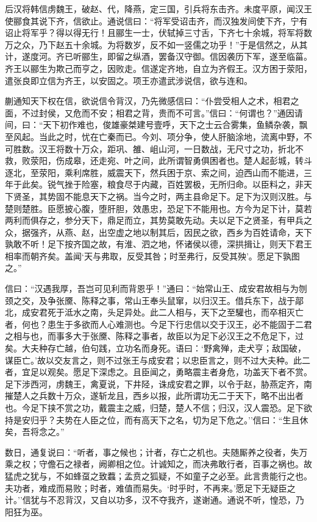 \documentclass[]{article}
\begin{document}
后汉将韩信虏魏王，破赵、代，降燕，定三国，引兵将东击齐。未度平原，闻汉王使郦食其说下齐，信欲止。通说信曰：``将军受诏击齐，而汉独发间使下齐，宁有诏止将军乎？得以得无行！且郦生一士，伏轼掉三寸舌，下齐七十余城，将军将数万之众，乃下赵五十余城。为将数岁，反不如一竖儒之功乎！''于是信然之，从其计，遂度河。齐已听郦生，即留之纵酒，罢备汉守御。信因袭历下军，遂至临菑。齐王以郦生为欺己而亨之，因败走。信遂定齐地，自立为齐假王。汉方困于荥阳，遣张良即立信为齐王，以安固之。项王亦遣武涉说信，欲与连和。

蒯通知天下权在信，欲说信令背汉，乃先微感信曰：``仆尝受相人之术，相君之面，不过封侯，又危而不安；相君之背，贵而不可言。''信曰：``何谓也？''通因请间，曰：``天下初作难也，俊雄豪桀建号壹呼，天下之士云合雾集，鱼鳞杂袭，飘至风起。当此之时，忧在亡秦而已。今刘、项分争，使人肝脑涂地，流离中野，不可胜数。汉王将数十万众，距巩、雒、岨山河，一日数战，无尺寸之功，折北不救，败荥阳，伤成皋，还走宛、叶之间，此所谓智勇俱困者也。楚人起彭城，转斗逐北，至荥阳，乘利席胜，威震天下，然兵困于京、索之间，迫西山而不能进，三年于此矣。锐气挫于险塞，粮食尽于内藏，百姓罢极，无所归命。以臣料之，非天下贤圣，其势固不能息天下之祸。当今之时，两主县命足下。足下为汉则汉胜。与楚则楚胜。臣愿披心腹，堕肝胆，效愚忠，恐足下不能用也。方今为足下计，莫若两利而俱存之，参分天下，鼎足而立，其势莫敢先动。夫以足下之贤圣，有甲兵之众，据强齐，从燕、赵，出空虚之地以制其后，因民之欲，西乡为百姓请命，天下孰敢不听！足下按齐国之故，有淮、泗之地，怀诸侯以德，深拱揖让，则天下君王相率而朝齐矣。盖闻`天与弗取，反受其咎；时至弗行，反受其殃'。愿足下孰图之。''

信曰：``汉遇我厚，吾岂可见利而背恩乎！''通曰：``始常山王、成安君故相与为刎颈之交，及争张黡、陈释之事，常山王奉头鼠窜，以归汉王。借兵东下，战于鄗北，成安君死于泜水之南，头足异处。此二人相与，天下之至驩也，而卒相灭亡者，何也？患生于多欲而人心难测也。今足下行忠信以交于汉王，必不能固于二君之相与也，而事多大于张黡、陈释之事者，故臣以为足下必汉王之不危足下，过矣。大夫种存亡越，伯句践，立功名而身死。语曰：`野禽殚，走犬亨；敌国破，谋臣亡。'故以交友言之，则不过张王与成安君；以忠臣言之，则不过大夫种。此二者，宜足以观矣。愿足下深虑之。且臣闻之，勇略震主者身危，功盖天下者不赏。足下涉西河，虏魏王，禽夏说，下井陉，诛成安君之罪，以令于赵，胁燕定齐，南摧楚人之兵数十万众，遂斩龙且，西乡以报，此所谓功无二于天下，略不出出者也。今足下挟不赏之功，戴震主之威，归楚，楚人不信；归汉，汉人震恐。足下欲持是安归乎？夫势在人臣之位，而有高天下之名，切为足下危之。''信曰：``生且休矣，吾将念之。''

数日，通复说曰：``听者，事之候也；计者，存亡之机也。夫随厮养之役者，失万乘之权；守儋石之禄者，阙卿相之位。计诚知之，而决弗敢行者，百事之祸也。故猛虎之犹与，不如蜂虿之致蠚；孟贲之狐疑，不如童子之必至。此言贵能行之也。夫功者，难成而易败；时者，难值而易失。`时乎时，不再来。'愿足下无疑臣之计。''信犹与不忍背汉，又自以功多，汉不夺我齐，遂谢通。通说不听，惶恐，乃阳狂为巫。
\end{document}
